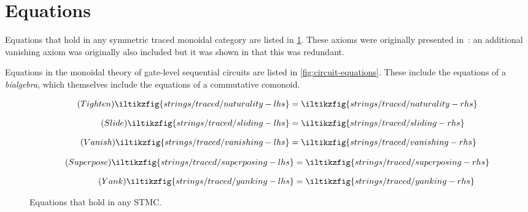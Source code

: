 \section{Equations}
\label{app:equations}

Equations that hold in any symmetric traced monoidal category are listed in
\cref{fig:stmc-axioms}.
These axioms were originally presented in~\cite{joyal1996traced}: an additional
vanishing axiom was originally also included but it was shown in
\cite{hasegawa2009traced} that this was redundant.

Equations in the monoidal theory of gate-level sequential circuits are listed in
\cref{fig:circuit-equations}.
These include the equations of a \emph{bialgebra}, which themselves include the
equations of a commutative comonoid.

\begin{figure}
    \centering
    \begin{minipage}{0.52\textwidth}
        \begin{align*}
            \tag{\(\mathsf{Tighten}\)}
            \iltikzfig{strings/traced/naturality-lhs}
            &=
            \iltikzfig{strings/traced/naturality-rhs}
            \label{eq:tightening}
            \\[0.75em]
            \tag{\(\mathsf{Slide}\)}
            \iltikzfig{strings/traced/sliding-lhs}
            &=
            \iltikzfig{strings/traced/sliding-rhs}
            \label{eq:sliding}
            \\[0.75em]
            \tag{\(\mathsf{Vanish}\)}
            \iltikzfig{strings/traced/vanishing-lhs}
            &=
            \iltikzfig{strings/traced/vanishing-rhs}
            \label{eq:vanishing}
        \end{align*}
    \end{minipage}
    \hspace{-1em}
    \begin{minipage}{0.455\textwidth}
        \begin{align*}
            \tag{\(\mathsf{Superpose}\)}
            \iltikzfig{strings/traced/superposing-lhs}
            &=
            \iltikzfig{strings/traced/superposing-rhs}
            \label{eq:superposing}
            \\[0.75em]
            \tag{\(\mathsf{Yank}\)}
            \iltikzfig{strings/traced/yanking-lhs}
            &=
            \iltikzfig{strings/traced/yanking-rhs}
            \label{eq:yanking}
        \end{align*}
    \end{minipage}
    \caption{Equations that hold in any STMC.}
    \label{fig:stmc-axioms}
\end{figure}

